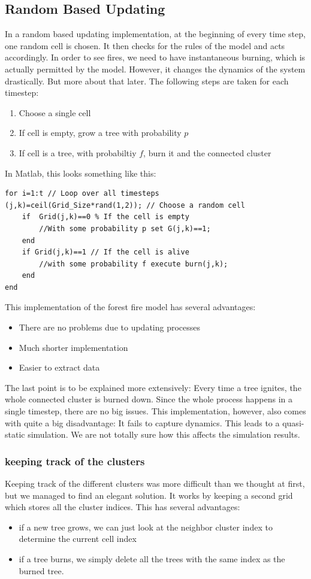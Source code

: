 \documentclass[11pt]{article}
\begin{document}
\subsection{Random Based Updating\cite{ref10}}
In a random based updating implementation, at the beginning of every time step, one random cell is chosen. It then checks for the rules of the model and acts accordingly. In order to see fires, we need to have instantaneous burning, which is actually permitted by the model. However, it changes the dynamics of the system drastically. But more about that later. The following steps are taken for each timestep:

\begin{enumerate}
\item Choose a single cell
\item If cell is empty, grow a tree with probability $p$
\item If cell is a tree, with probabiltiy $f$, burn it and the connected cluster
\end{enumerate}
In Matlab, this looks something like this:

\begin{verbatim}
for i=1:t // Loop over all timesteps
(j,k)=ceil(Grid_Size*rand(1,2)); // Choose a random cell
	if  Grid(j,k)==0 % If the cell is empty
		//With some probability p set G(j,k)==1;
	end
	if Grid(j,k)==1 // If the cell is alive
		//with some probability f execute burn(j,k);
	end
end
\end{verbatim}

This implementation of the forest fire model has several advantages:
\begin{itemize}
\item There are no problems due to updating processes
\item Much shorter implementation
\item Easier to extract data
\end{itemize}
The last point is to be explained more extensively: Every time a tree ignites, the whole connected cluster is burned down. Since the whole process happens in a single timestep, there are no big issues.
This implementation, however, also comes with quite a big disadvantage: It fails to capture dynamics. This leads to a quasi-static simulation. We are not totally sure how this affects the simulation results.

\subsubsection{keeping track of the clusters}
Keeping track of the different clusters was more difficult than we thought at first, but we managed to find an elegant solution. It works by keeping a second grid which stores all the cluster indices. This has several advantages:
\begin{itemize}
\item if a new tree grows, we can just look at the neighbor cluster index to determine the current cell index
\item if a tree burns, we simply delete all the trees with the same index as the burned tree.
\end {itemize}
\end{document}

